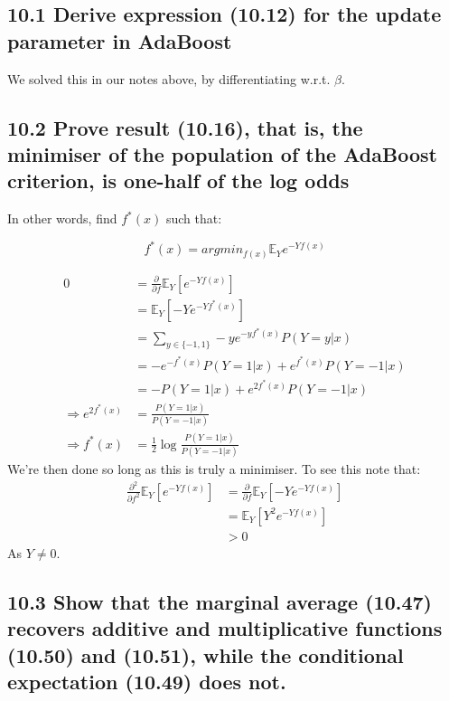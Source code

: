 \subsection*{10.1 Derive expression (10.12) for the update parameter in AdaBoost}
We solved this in our notes above, by differentiating w.r.t. $\beta$.

\subsection*{10.2 Prove result (10.16), that is, the minimiser of the population of the AdaBoost criterion, is one-half of the log odds}

In other words, find $f^*(x)$ such that:

$$ f^*(x) = argmin_{f(x)} \mathbb{E}_Y e^{-Yf(x)}$$

\begin{align*}
    0 &= \frac{\partial}{\partial f}  \mathbb{E}_Y \left[e^{-Yf(x)}\right]\\
    &=   \mathbb{E}_Y \left[-Ye^{-Yf^*(x)}\right]\\
    &=   \sum_{y \in \{-1, 1\}} -ye^{-yf^*(x)} P(Y = y \vert x) \\
    &=   -e^{-f^*(x)} P(Y = 1 \vert x) + e^{f^*(x)} P(Y = -1 \vert x) \\
    &=   -P(Y = 1 \vert x) + e^{2 f^*(x)} P(Y = -1 \vert x) \\
    \Rightarrow e^{2 f^*(x)} &= \frac{P(Y = 1 \vert x)}{P(Y = -1 \vert x) }\\
    \Rightarrow f^*(x) &= \frac{1}{2} \log \frac{P(Y = 1 \vert x)}{P(Y = -1 \vert x) }
\end{align*}
We're then done so long as this is truly a minimiser. To see this note that:
\begin{align*}
     \frac{\partial^2}{\partial f^2}  \mathbb{E}_Y \left[e^{-Yf(x)}\right] &= \frac{\partial}{\partial f} \mathbb{E}_Y \left[-Ye^{-Yf(x)}\right] \\
     &=  \mathbb{E}_Y \left[Y^2 e^{-Yf(x)}\right] \\
     &> 0
\end{align*}
As $Y \neq 0$.

\subsection{10.3 Show that the marginal average (10.47) recovers additive and multiplicative functions (10.50) and (10.51), while the conditional expectation (10.49) does not.}

